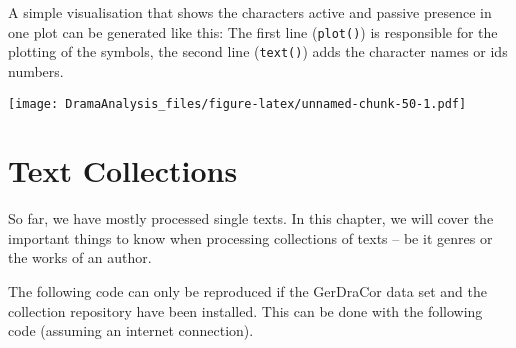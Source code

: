 \documentclass[]{book}
\newenvironment{Shaded}{\begin{snugshade}}{\end{snugshade}}
\newcommand{\DataTypeTok}[1]{\textcolor[rgb]{0.13,0.29,0.53}{#1}}
\newcommand{\DecValTok}[1]{\textcolor[rgb]{0.00,0.00,0.81}{#1}}
\newcommand{\KeywordTok}[1]{\textcolor[rgb]{0.13,0.29,0.53}{\textbf{#1}}}
\newcommand{\NormalTok}[1]{#1}
\newcommand{\OperatorTok}[1]{\textcolor[rgb]{0.81,0.36,0.00}{\textbf{#1}}}
\newcommand{\StringTok}[1]{\textcolor[rgb]{0.31,0.60,0.02}{#1}}
\begin{document}
A simple visualisation that shows the characters active and passive presence in one plot can be generated like this: The first line (\texttt{plot()}) is responsible for the plotting of the symbols, the second line (\texttt{text()}) adds the character names or ids numbers.

\begin{Shaded}
\end{Shaded}

\texttt{[image: DramaAnalysis\_files/figure-latex/unnamed-chunk-50-1.pdf]}

\hypertarget{text-collections}{%
\chapter{Text Collections}\label{text-collections}}

So far, we have mostly processed single texts. In this chapter, we will cover the important things to know when processing collections of texts -- be it genres or the works of an author.

The following code can only be reproduced if the GerDraCor data set and the collection repository have been installed. This can be done with the following code (assuming an internet connection).
\end{document}
